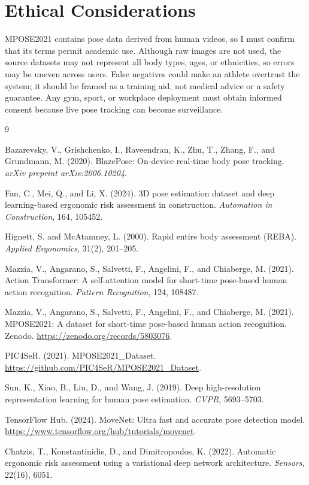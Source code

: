 \documentclass[final]{article}
\begin{document}
\section*{Ethical Considerations}
MPOSE2021 contains pose data derived from human videos, so I must confirm that its terms permit academic use. Although raw images are not used, the source datasets may not represent all body types, ages, or ethnicities, so errors may be uneven across users. False negatives could make an athlete overtrust the system; it should be framed as a training aid, not medical advice or a safety guarantee. Any gym, sport, or workplace deployment must obtain informed consent because live pose tracking can become surveillance.


\newpage
\begin{thebibliography}{9}

Bazarevsky, V., Grishchenko, I., Raveendran, K., Zhu, T., Zhang, F., and Grundmann, M. (2020).
\newblock BlazePose: On-device real-time body pose tracking.
\newblock \textit{arXiv preprint arXiv:2006.10204}.

Fan, C., Mei, Q., and Li, X. (2024).
\newblock 3D pose estimation dataset and deep learning-based ergonomic risk assessment in construction.
\newblock \textit{Automation in Construction}, 164, 105452.

Hignett, S. and McAtamney, L. (2000).
\newblock Rapid entire body assessment (REBA).
\newblock \textit{Applied Ergonomics}, 31(2), 201--205.

Mazzia, V., Angarano, S., Salvetti, F., Angelini, F., and Chiaberge, M. (2021).
\newblock Action Transformer: A self-attention model for short-time pose-based human action recognition.
\newblock \textit{Pattern Recognition}, 124, 108487.

Mazzia, V., Angarano, S., Salvetti, F., Angelini, F., and Chiaberge, M. (2021).
\newblock MPOSE2021: A dataset for short-time pose-based human action recognition.
\newblock Zenodo. \url{https://zenodo.org/records/5803076}.

PIC4SeR. (2021).
\newblock MPOSE2021\_Dataset.
\newblock \url{https://github.com/PIC4SeR/MPOSE2021_Dataset}.

Sun, K., Xiao, B., Liu, D., and Wang, J. (2019).
\newblock Deep high-resolution representation learning for human pose estimation.
\newblock \textit{CVPR}, 5693--5703.

TensorFlow Hub. (2024).
\newblock MoveNet: Ultra fast and accurate pose detection model.
\newblock \url{https://www.tensorflow.org/hub/tutorials/movenet}.

Chatzis, T., Konstantinidis, D., and Dimitropoulos, K. (2022).
\newblock Automatic ergonomic risk assessment using a variational deep network architecture.
\newblock \textit{Sensors}, 22(16), 6051.

\end{thebibliography}
\end{document}
